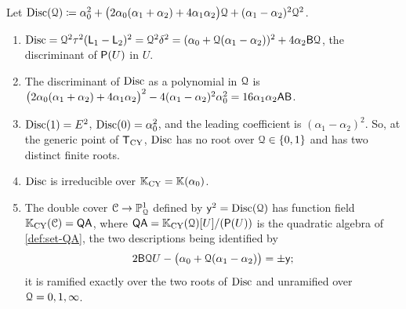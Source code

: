 \begin{lem}
\label{lem:set-disc}
Let $\operatorname{Disc}(\mathcal{Q})\coloneqq\alpha_0^2+\big(2\alpha_0(\alpha_1+\alpha_2)+4\alpha_1\alpha_2\big)\mathcal{Q}+(\alpha_1-\alpha_2)^2\mathcal{Q}^2$.
\begin{enumerate}
\item $\operatorname{Disc}=\mathcal{Q}^2\tau^2(\mathsf{L}_1-\mathsf{L}_2)^2=\mathcal{Q}^2\delta^2=(\alpha_0+\mathcal{Q}(\alpha_1-\alpha_2))^2+4\alpha_2\mathsf{B}\mathcal{Q}$, the discriminant of $\mathsf{P}(U)$ in $U$.
\item The discriminant of $\operatorname{Disc}$ as a polynomial in $\mathcal{Q}$ is $\big(2\alpha_0(\alpha_1+\alpha_2)+4\alpha_1\alpha_2\big)^2-4(\alpha_1-\alpha_2)^2\alpha_0^2=16\alpha_1\alpha_2\mathsf{A}\mathsf{B}$.
\item $\operatorname{Disc}(1)=E^2$, $\operatorname{Disc}(0)=\alpha_0^2$, and the leading coefficient is $(\alpha_1-\alpha_2)^2$. So, at the generic point of $\mathsf{T}_{\mathrm{CY}}$, $\operatorname{Disc}$ has no root over $\mathcal{Q}\in\{0,1\}$ and has two distinct finite roots.
\item $\operatorname{Disc}$ is irreducible over $\mathbb{K}_{\mathrm{CY}}=\mathbb{K}(\alpha_0)$.
\item The double cover $\mathcal{C}\to\mathbb{P}^1_{\mathcal{Q}}$ defined by $\mathsf{y}^2=\operatorname{Disc}(\mathcal{Q})$ has function field $\mathbb{K}_{\mathrm{CY}}(\mathcal{C})=\mathsf{QA}$, where $\mathsf{QA}=\mathbb{K}_{\mathrm{CY}}(\mathcal{Q})[U]/(\mathsf{P}(U))$ is the quadratic algebra of \cref{def:set-QA}, the two descriptions being identified by
\[
2\mathsf{B}\mathcal{Q} U-\big(\alpha_0+\mathcal{Q}(\alpha_1-\alpha_2)\big)=\pm\mathsf{y} ;
\]
it is ramified exactly over the two roots of $\operatorname{Disc}$ and unramified over $\mathcal{Q}=0,1,\infty$.
\end{enumerate}
\end{lem}

